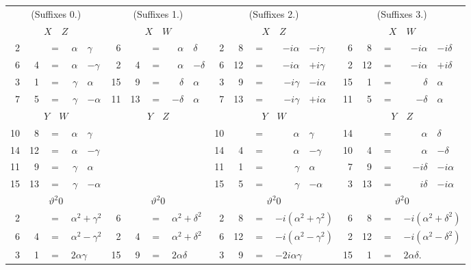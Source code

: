 \documentclass[11pt]{article}
\begin{document}
\smallskip
{\footnotesize
\begin{center}
\begin{tabular}{rrcrl||rrcrl||rrcrl||rrcrl}
\multicolumn{5}{c||}{(Suffixes 0.)} & \multicolumn{5}{c||}{(Suffixes 1.)} & \multicolumn{5}{c||}{(Suffixes 2.)} & \multicolumn{5}{c}{(Suffixes 3.)}\\
\multicolumn{5}{c||}{$X\quad Z$} & \multicolumn{5}{c||}{$X\quad W$} & \multicolumn{5}{c||}{$X\quad Z$} & \multicolumn{5}{c}{$X\quad W$}\\\hline
2 & & $=$ & $\alpha$ & $\gamma$ & 6 & & $=$ & $\alpha$ & $\delta$ & 2 & 8 & $=$ & $-i\alpha$ & $-i\gamma$ & 6 & 8 & $=$ & $-i\alpha$ & $-i\delta$\\
6 & 4 & $=$ & $\alpha$ & $-\gamma$ & 2 & 4 & $=$ & $\alpha$ & $-\delta$ & 6 & 12 & $=$ & $-i\alpha$ & $+i\gamma$ & 2 & 12 & $=$ & $-i\alpha$ & $+i\delta$\\
3 & 1 & $=$ & $\gamma$ & $\alpha$ & 15 & 9 & $=$ & $\delta$ & $\alpha$ & 3 & 9 & $=$ & $-i\gamma$ & $-i\alpha$ & 15 & 1 & $=$ & $\delta$ & $\alpha$\\
7 & 5 & $=$ & $\gamma$ & $-\alpha$ & 11 & 13 & $=$ & $-\delta$ & $\alpha$ & 7 & 13 & $=$ & $-i\gamma$ & $+i\alpha$ & 11 & 5 & $=$ & $-\delta$ & $\alpha$\\\hline
\multicolumn{5}{c||}{$Y\quad W$} & \multicolumn{5}{c||}{$Y\quad Z$} & \multicolumn{5}{c||}{$Y\quad W$} & \multicolumn{5}{c}{$Y\quad Z$}\\
10 & 8 & $=$ & $\alpha$ & $\gamma$ & & & & & & 10 & & $=$ & $\alpha$ & $\gamma$ & 14 & & $=$ & $\alpha$ & $\delta$\\
14 & 12 & $=$ & $\alpha$ & $-\gamma$ & & & & & & 14 & 4 & $=$ & $\alpha$ & $-\gamma$ & 10 & 4 & $=$ & $\alpha$ & $-\delta$\\
11 & 9 & $=$ & $\gamma$ & $\alpha$ & & & & & & 11 & 1 & $=$ & $\gamma$ & $\alpha$ & 7 & 9 & $=$ & $-i\delta$ & $-i\alpha$\\
15 & 13 & $=$ & $\gamma$ & $-\alpha$ & & & & & & 15 & 5 & $=$ & $\gamma$ & $-\alpha$ & 3 & 13 & $=$ & $i\delta$ & $-i\alpha$\\\hline
\multicolumn{5}{c||}{$\vartheta^2 0$} & \multicolumn{5}{c||}{$\vartheta^2 0$} & \multicolumn{5}{c||}{$\vartheta^2 0$} & \multicolumn{5}{c}{$\vartheta^2 0$}\\
2 & & $=$ & \multicolumn{2}{l||}{$\alpha^2 + \gamma^2$} & 6 & & $=$ & \multicolumn{2}{l||}{$\alpha^2 + \delta^2$} & 2 & 8 & $=$ & \multicolumn{2}{l||}{$-i(\alpha^2 + \gamma^2)$} & 6 & 8 & $=$ & \multicolumn{2}{l}{$-i(\alpha^2 + \delta^2)$}\\
6 & 4 & $=$ & \multicolumn{2}{l||}{$\alpha^2 - \gamma^2$} & 2 & 4 & $=$ & \multicolumn{2}{l||}{$\alpha^2 + \delta^2$} & 6 & 12 & $=$ & \multicolumn{2}{l||}{$-i(\alpha^2 - \gamma^2)$} & 2 & 12 & $=$ & \multicolumn{2}{l}{$-i(\alpha^2 - \delta^2)$}\\
3 & 1 & $=$ & \multicolumn{2}{l||}{$2\alpha\gamma$} & 15 & 9 & $=$ & \multicolumn{2}{l||}{$2\alpha\delta$} & 3 & 9 & $=$ & \multicolumn{2}{l||}{$-2i\alpha\gamma$} & 15 & 1 & $=$ & \multicolumn{2}{l}{$2\alpha\delta$.}\\
\end{tabular}
\end{center}
}
\end{document}
